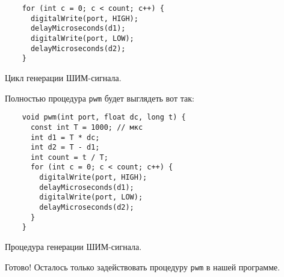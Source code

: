 \documentclass[../sparc.tex]{subfiles}
\begin{document}
\begin{listing}[H]
  \begin{verbatim}
    for (int c = 0; c < count; c++) {
      digitalWrite(port, HIGH);
      delayMicroseconds(d1);
      digitalWrite(port, LOW);
      delayMicroseconds(d2);
    }
  \end{verbatim}
  \label{listing:pwm-cycle}
  \caption{Цикл генерации ШИМ-сигнала.}
\end{listing}

Полностью процедура \texttt{pwm} будет выглядеть вот так:

\begin{listing}[H]
  \begin{verbatim}
    void pwm(int port, float dc, long t) {
      const int T = 1000; // мкс
      int d1 = T * dc;
      int d2 = T - d1;
      int count = t / T;
      for (int c = 0; c < count; c++) {
        digitalWrite(port, HIGH);
        delayMicroseconds(d1);
        digitalWrite(port, LOW);
        delayMicroseconds(d2);
      }
    }
  \end{verbatim}
  \label{listing:pwm-procedure}
  \caption{Процедура генерации ШИМ-сигнала.}
\end{listing}

Готово! Осталось только задействовать процедуру \texttt{pwm} в нашей программе.
\end{document}
